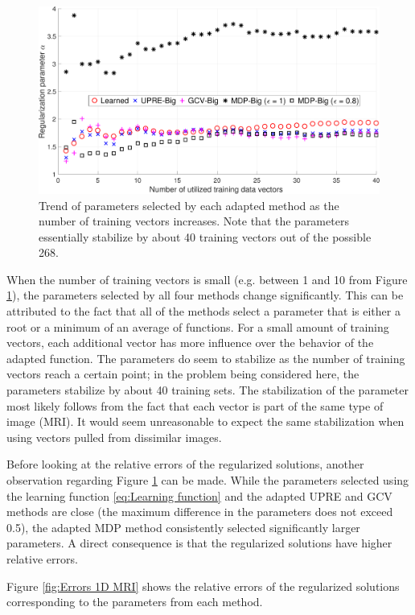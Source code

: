 \documentclass[12pt]{article}
\begin{document}
\begin{figure}[ht]
\includegraphics[scale=0.36]{Figures/Parameters1D_mri}
\caption{Trend of parameters selected by each adapted method as the number of training vectors increases. Note that the parameters essentially stabilize by about 40 training vectors out of the possible 268.}
\label{fig:Parameters 1D MRI}
\end{figure}

\noindent When the number of training vectors is small (e.g. between 1 and 10 from Figure \ref{fig:Parameters 1D MRI}), the parameters selected by all four methods change significantly. This can be attributed to the fact that all of the methods select a parameter that is either a root or a minimum of an average of functions. For a small amount of training vectors, each additional vector has more influence over the behavior of the adapted function. The parameters do seem to stabilize as the number of training vectors reach a certain point; in the problem being considered here, the parameters stabilize by about 40 training sets. The stabilization of the parameter most likely follows from the fact that each vector is part of the same type of image (MRI). It would seem unreasonable to expect the same stabilization when using vectors pulled from dissimilar images. \par 
Before looking at the relative errors of the regularized solutions, another observation regarding Figure \ref{fig:Parameters 1D MRI} can be made. While the parameters selected using the learning function \eqref{eq:Learning function} and the adapted UPRE and GCV methods are close (the maximum difference in the parameters does not exceed 0.5), the adapted MDP method consistently selected significantly larger parameters. A direct consequence is that the regularized solutions have higher relative errors. \par
Figure \ref{fig:Errors 1D MRI} shows the relative errors of the regularized solutions corresponding to the parameters from each method. 
\end{document}
